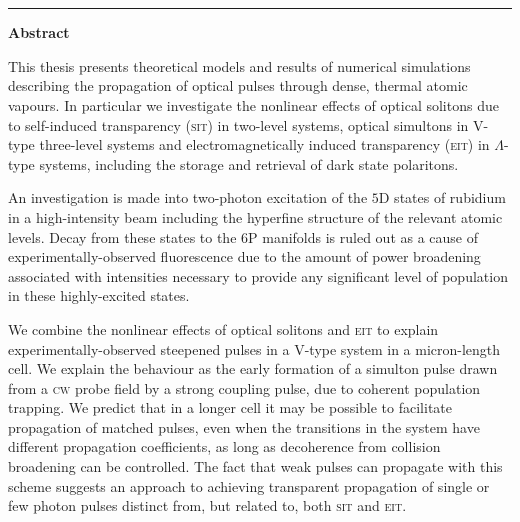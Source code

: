   \thispagestyle{empty}
  \vspace{-1cm}
  \begin{center}
  {\huge \textbf{\thesistitle}}
  \\
  \vspace{0.8cm} {\Large \textbf{\myname}\\\rule{7cm}{0.2mm}}
  \end{center}
  \vspace{0.6cm}
  {\large \textbf{Abstract}}

  \begin{small}
  This thesis presents theoretical models and results of numerical simulations
  describing the propagation of optical pulses through dense, thermal atomic
  vapours. In particular we investigate the nonlinear effects of optical
  solitons due to self-induced transparency (\textsc{sit}) in two-level systems,
  optical simultons in V-type three-level systems and electromagnetically
  induced transparency (\textsc{eit}) in $\Lambda$-type systems, including the
  storage and retrieval of dark state polaritons.

  An investigation is made into two-photon excitation of the $5$D states of
  rubidium in a high-intensity beam including the hyperfine structure of the
  relevant atomic levels. Decay from these states to the $6$P manifolds is ruled
  out as a cause of experimentally-observed fluorescence due to the amount of
  power broadening associated with intensities necessary to provide any
  significant level of population in these highly-excited states.

  We combine the nonlinear effects of optical solitons and \textsc{eit} to
  explain experimentally-observed steepened pulses in a V-type system in a
  micron-length cell. We explain the behaviour as the early formation of a
  simulton pulse drawn from a \textsc{cw} probe field by a strong coupling
  pulse, due to coherent population trapping. We predict that in a longer cell
  it may be possible to facilitate propagation of matched pulses, even when the
  transitions in the system have different propagation coefficients, as long as
  decoherence from collision broadening can be controlled. The fact that weak
  pulses can propagate with this scheme suggests an approach to achieving
  transparent propagation of single or few photon pulses distinct from, but
  related to, both \textsc{sit} and \textsc{eit}.

  \end{small}

  \newpage